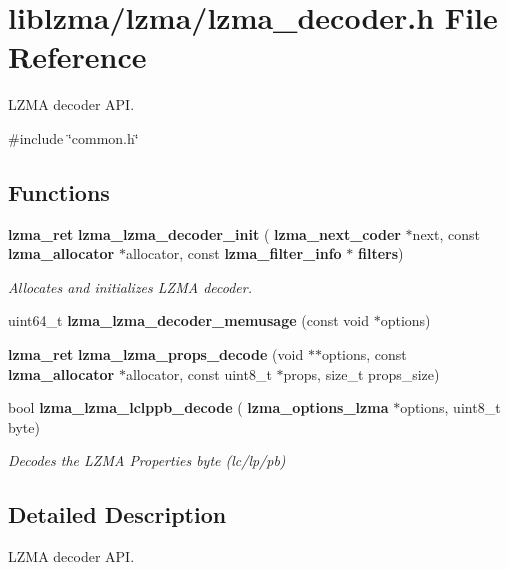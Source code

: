 \section{liblzma/lzma/lzma\+\_\+decoder.h File Reference}
\label{lzma__decoder_8h}


L\+Z\+MA decoder A\+PI.  


{\ttfamily \#include \char`\"{}common.\+h\char`\"{}}\newline
\subsection*{Functions}
\begin{DoxyCompactItemize}
\item 
\textbf{ lzma\+\_\+ret} \textbf{ lzma\+\_\+lzma\+\_\+decoder\+\_\+init} (\textbf{ lzma\+\_\+next\+\_\+coder} $\ast$next, const \textbf{ lzma\+\_\+allocator} $\ast$allocator, const \textbf{ lzma\+\_\+filter\+\_\+info} $\ast$\textbf{ filters})
\begin{DoxyCompactList}\small\item\em Allocates and initializes L\+Z\+MA decoder. \end{DoxyCompactList}\item 
\mbox{\label{lzma__decoder_8h_aad2f0056516cc2d78de478a41418307e}} 
uint64\+\_\+t {\bfseries lzma\+\_\+lzma\+\_\+decoder\+\_\+memusage} (const void $\ast$options)
\item 
\mbox{\label{lzma__decoder_8h_aa240cbafdddb6c29c61681d01f2fcf04}} 
\textbf{ lzma\+\_\+ret} {\bfseries lzma\+\_\+lzma\+\_\+props\+\_\+decode} (void $\ast$$\ast$options, const \textbf{ lzma\+\_\+allocator} $\ast$allocator, const uint8\+\_\+t $\ast$props, size\+\_\+t props\+\_\+size)
\item 
bool \textbf{ lzma\+\_\+lzma\+\_\+lclppb\+\_\+decode} (\textbf{ lzma\+\_\+options\+\_\+lzma} $\ast$options, uint8\+\_\+t byte)
\begin{DoxyCompactList}\small\item\em Decodes the L\+Z\+MA Properties byte (lc/lp/pb) \end{DoxyCompactList}\end{DoxyCompactItemize}


\subsection{Detailed Description}
L\+Z\+MA decoder A\+PI. 



